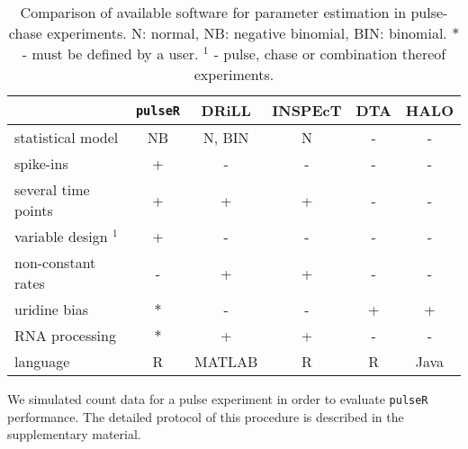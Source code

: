 \begin{table}[tbh]
 \vspace*{-.3cm}
 \begin{tabular}{|l|c|c|c|c|c|}\hline
                        &\verb|pulseR| &DRiLL          &INSPEcT&DTA    &HALO       \\\hline
 statistical model      & NB           &N, BIN         &N       & -    & -      \\\hline                         
 spike-ins              & +            &   -           &  -     &  -    & -         \\\hline               
 several time points    & +            &   +           &  +     &  -    & -         \\\hline                    
  variable design $^1$  & +            &   -           &  -     &  -    & -         \\\hline 
 non-constant rates     & -            &   +           &  +     &  -    & -         \\\hline 
      uridine bias      & $\ast$       &   -           &  -     &  +    & +         \\\hline 
       RNA processing   &$\ast$        &   +           &  +     &  -    & -         \\\hline 
  language              & R            &MATLAB         &  R     &  R    & Java      \\\hline 
 \end{tabular}
 \vspace*{.2cm}
\caption{
Comparison of available software for parameter estimation in 
pulse-chase experiments. N: normal, NB: negative binomial, BIN: binomial.
$\ast$ - must be defined by a user. $^1$ - pulse, chase or combination thereof experiments.
 \vspace*{-.5cm}
}
\end{table}
We simulated count data for a pulse experiment 
in order to evaluate \verb|pulseR| performance.
The  detailed protocol of this procedure is described in the supplementary material.

